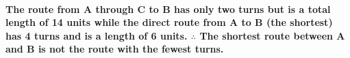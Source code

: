\begin{minipage}{.60\textwidth}
\paragraph{{\color{answer}{}The route from A through C to B has only two turns but is a total length of 14 units while the direct route from A to B (the shortest) has 4 turns and is a length of 6 units. $\therefore$ The shortest route between A and B is not the route with the fewest turns. }}

\end{minipage} \newline{}

